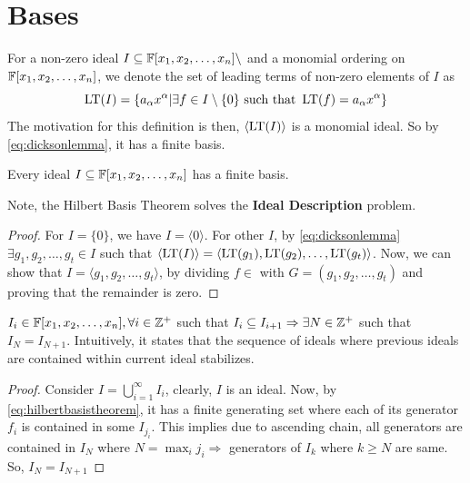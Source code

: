 \documentclass[a4paper,11pt]{article}
\begin{document}
\section{\Grob Bases}{\label{sec:gbintro}}
\begin{defn}
    For a non-zero ideal $I\subseteq\mathbb{F}[x_1, x_2, \ldots, x_n]\setminus$ and a monomial ordering on $\mathbb{F}[x_1, x_2, \ldots, x_n]$, we denote the set of leading terms of non-zero elements of $I$ as
    \begin{equation}
        \operatorname{LT}(I)=\{a_\alpha x^\alpha|\exists f\in I\setminus\{0\} \text{ such that } \operatorname{LT}(f)=a_\alpha x^\alpha\}
    \end{equation}
    The motivation for this definition is then, $\langle \operatorname{LT}(I)\rangle$ is a monomial ideal. So by \ref{eq:dicksonlemma}, it has a finite basis.
\end{defn}
\begin{theorem}{\label{eq:hilbertbasistheorem}}
    Every ideal $I\subseteq \mathbb{F}[x_1, x_2, \ldots, x_n]$ has a finite basis.
\end{theorem}
Note, the Hilbert Basis Theorem solves the \textbf{Ideal Description} problem.
\begin{proof}
    For $I=\{0\}$, we have $I=\langle 0\rangle$. For other $I$, by \ref{eq:dicksonlemma} $\exists g_1, g_2, \ldots, g_t\in I$ such that $\langle \operatorname{LT}(I)\rangle=\langle \operatorname{LT}(g_1), \operatorname{LT}(g_2), \ldots, \operatorname{LT}(g_t)\rangle$. Now, we can show that $I=\langle g_1, g_2, \ldots, g_t\rangle$, by dividing $f\in$ with $G = (g_1, g_2, \ldots, g_t)$ and proving that the remainder is zero.
\end{proof}
\begin{theorem}{\label{eq:ascendingchaincondition}}
    $I_i\in\mathbb{F}[x_1, x_2, \ldots, x_n], \forall i\in\mathbb{Z}^+$ such that $I_i\subseteq I_{i+1}\Rightarrow \exists N\in\mathbb{Z}^+$ such that $I_{N}=I_{N+1}$.
    Intuitively, it states that the sequence of ideals where previous ideals are contained within current ideal stabilizes.
\end{theorem}
\begin{proof}
    Consider $I=\bigcup_{i=1}^\infty I_i$, clearly, $I$ is an ideal. Now, by \ref{eq:hilbertbasistheorem}, it has a finite generating set where each of its generator $f_i$ is contained in some $I_{j_i}$. This implies due to ascending chain, all generators are contained in $I_N$ where $N=\max_{i}j_i\Rightarrow$ generators of $I_k$ where $k\geq N$ are same. So, $I_N=I_{N+1}$
\end{proof}
\end{document}
